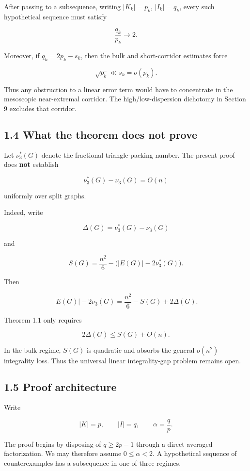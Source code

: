 \documentclass[11pt,a4paper]{article}
\begin{document}
After passing to a subsequence, writing \(|K_k|=p_k\), \(|I_k|=q_k\), every such hypothetical sequence must satisfy

\[
\frac{q_k}{p_k}\longrightarrow 2.
\]

Moreover, if \(q_k=2p_k-s_k\), then the bulk and short-corridor estimates force

\[
\sqrt{p_k}\ll s_k=o(p_k).
\]

Thus any obstruction to a linear error term would have to concentrate in the mesoscopic near-extremal corridor. The high/low-dispersion dichotomy in Section 9 excludes that corridor.

\subsection{1.4 What the theorem does not prove}\label{what-the-theorem-does-not-prove}

Let \(\nu_3^*(G)\) denote the fractional triangle-packing number. The present proof does \textbf{not} establish

\[
\nu_3^*(G)-\nu_3(G)=O(n)
\tag{1.4}
\]

uniformly over split graphs.

Indeed, write

\[
\Delta(G)=\nu_3^*(G)-\nu_3(G)
\]

and

\[
S(G)=\frac{n^2}{6}-\bigl(|E(G)|-2\nu_3^*(G)\bigr).
\]

Then

\[
|E(G)|-2\nu_3(G)
=
\frac{n^2}{6}-S(G)+2\Delta(G).
\tag{1.5}
\]

Theorem 1.1 only requires

\[
2\Delta(G)\le S(G)+O(n).
\]

In the bulk regime, \(S(G)\) is quadratic and absorbs the general \(o(n^2)\) integrality loss. Thus the universal linear integrality-gap problem remains open.

\subsection{1.5 Proof architecture}\label{proof-architecture}

Write

\[
|K|=p,
\qquad
|I|=q,
\qquad
\alpha=\frac qp.
\]

The proof begins by disposing of \(q\ge2p-1\) through a direct averaged factorization. We may therefore assume \(0\le\alpha<2\). A hypothetical sequence of counterexamples has a subsequence in one of three regimes.
\end{document}
